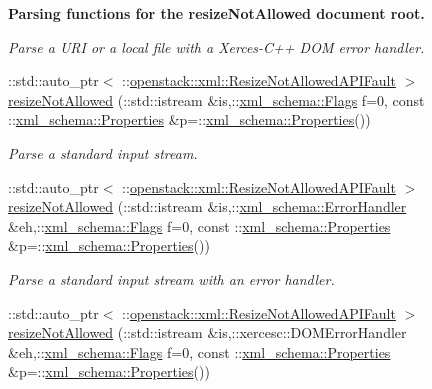 \begin{Indent}{\bf Parsing functions for the resizeNotAllowed document root.}
\begin{DoxyCompactItemize}
\begin{DoxyCompactList}\small\item\em Parse a URI or a local file with a Xerces-\/C++ DOM error handler. \item\end{DoxyCompactList}\item 
::std::auto\_\-ptr$<$ ::\hyperlink{classopenstack_1_1xml_1_1ResizeNotAllowedAPIFault}{openstack::xml::ResizeNotAllowedAPIFault} $>$ \hyperlink{namespaceopenstack_1_1xml_a607f3e126b4777f30e6119ba282fb8ad}{resizeNotAllowed} (::std::istream \&is,::\hyperlink{namespacexml__schema_affb4c227cbd9aa7453dd1dc5a1401943}{xml\_\-schema::Flags} f=0, const ::\hyperlink{namespacexml__schema_ad27ce19a7ee1d3b1064092648898f64c}{xml\_\-schema::Properties} \&p=::\hyperlink{namespacexml__schema_ad27ce19a7ee1d3b1064092648898f64c}{xml\_\-schema::Properties}())
\begin{DoxyCompactList}\small\item\em Parse a standard input stream. \item\end{DoxyCompactList}\item 
::std::auto\_\-ptr$<$ ::\hyperlink{classopenstack_1_1xml_1_1ResizeNotAllowedAPIFault}{openstack::xml::ResizeNotAllowedAPIFault} $>$ \hyperlink{namespaceopenstack_1_1xml_a3b14164e4485f007c70e61f1cfd5dea8}{resizeNotAllowed} (::std::istream \&is,::\hyperlink{namespacexml__schema_ab1c9361bfd3b404eaabf0c31eded79dc}{xml\_\-schema::ErrorHandler} \&eh,::\hyperlink{namespacexml__schema_affb4c227cbd9aa7453dd1dc5a1401943}{xml\_\-schema::Flags} f=0, const ::\hyperlink{namespacexml__schema_ad27ce19a7ee1d3b1064092648898f64c}{xml\_\-schema::Properties} \&p=::\hyperlink{namespacexml__schema_ad27ce19a7ee1d3b1064092648898f64c}{xml\_\-schema::Properties}())
\begin{DoxyCompactList}\small\item\em Parse a standard input stream with an error handler. \item\end{DoxyCompactList}\item 
::std::auto\_\-ptr$<$ ::\hyperlink{classopenstack_1_1xml_1_1ResizeNotAllowedAPIFault}{openstack::xml::ResizeNotAllowedAPIFault} $>$ \hyperlink{namespaceopenstack_1_1xml_ada5ceb7ac6874150b5d051d9bf4e2caf}{resizeNotAllowed} (::std::istream \&is,::xercesc::DOMErrorHandler \&eh,::\hyperlink{namespacexml__schema_affb4c227cbd9aa7453dd1dc5a1401943}{xml\_\-schema::Flags} f=0, const ::\hyperlink{namespacexml__schema_ad27ce19a7ee1d3b1064092648898f64c}{xml\_\-schema::Properties} \&p=::\hyperlink{namespacexml__schema_ad27ce19a7ee1d3b1064092648898f64c}{xml\_\-schema::Properties}())

\end{DoxyCompactItemize}
\end{Indent}
